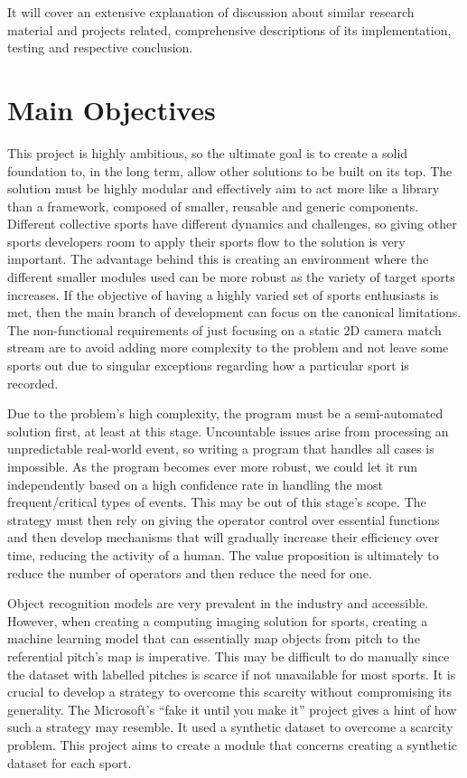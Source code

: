 \documentclass[
    11pt,
    oneside
]{report}
\begin{document}
It will cover an extensive explanation of discussion about similar research material and projects related, comprehensive descriptions of its implementation, testing and respective conclusion.



\section{Main Objectives}



This project is highly ambitious, so the ultimate goal is to create a solid foundation to, in the long term, allow other solutions to be built on its top. The solution must be highly modular and effectively aim to act more like a library than a framework, composed of smaller, reusable and generic components. Different collective sports have different dynamics and challenges, so giving other sports developers room to apply their sports flow to the solution is very important. The advantage behind this is creating an environment where the different smaller modules used can be more robust as the variety of target sports increases. If the objective of having a highly varied set of sports enthusiasts is met, then the main branch of development can focus on the canonical limitations. The non-functional requirements of just focusing on a static 2D camera match stream are to avoid adding more complexity to the problem and not leave some sports out due to singular exceptions regarding how a particular sport is recorded.


Due to the problem's high complexity, the program must be a semi-automated solution first, at least at this stage. Uncountable issues arise from processing an unpredictable real-world event, so writing a program that handles all cases is impossible. As the program becomes ever more robust, we could let it run independently based on a high confidence rate in handling the most frequent/critical types of events. This may be out of this stage's scope. The strategy must then rely on giving the operator control over essential functions and then develop mechanisms that will gradually increase their efficiency over time, reducing the activity of a human. The value proposition is ultimately to reduce the number of operators and then reduce the need for one.


Object recognition models are very prevalent in the industry and accessible. However, when creating a computing imaging solution for sports, creating a machine learning model that can essentially map objects from pitch to the referential pitch's map is imperative. This may be difficult to do manually since the dataset with labelled pitches is scarce if not unavailable for most sports. It is crucial to develop a strategy to overcome this scarcity without compromising its generality. The Microsoft's ``fake it until you make it'' project \cite{ms_fake} gives a hint of how such a strategy may resemble. It used a synthetic dataset to overcome a scarcity problem. This project aims to create a module that concerns creating a synthetic dataset for each sport.
\end{document}
